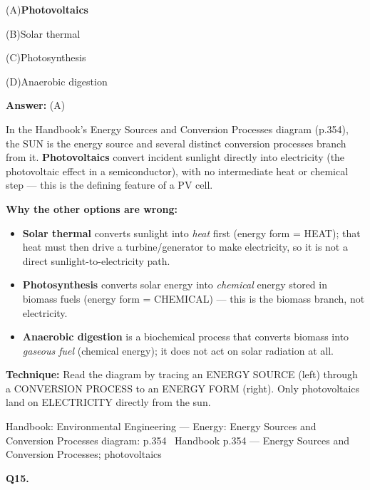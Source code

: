 \documentclass[11pt]{article}
\newcommand{\correct}[1]{\textbf{#1}\;{\color{accent}$\checkmark$}}
\newcommand{\optline}[2]{\par\noindent\hspace{1.2em}(#1)\hspace{0.6em}#2}
\begin{document}
\optline{A}{\correct{Photovoltaics}}
\optline{B}{Solar thermal}
\optline{C}{Photosynthesis}
\optline{D}{Anaerobic digestion}
\par\vspace{3pt}
\vspace{2pt}\par\noindent\colorbox{boxbg}{\parbox{\dimexpr\linewidth-2\fboxsep\relax}{%
\vspace{2pt}\textbf{Answer:} (A)\par\vspace{2pt}
{\small In the Handbook's Energy Sources and Conversion Processes diagram (p.354), the SUN is the energy source and several distinct conversion processes branch from it. \textbf{Photovoltaics} convert incident sunlight directly into electricity (the photovoltaic effect in a semiconductor), with no intermediate heat or chemical step --- this is the defining feature of a PV cell.\par
\textbf{Why the other options are wrong:}\par
\begin{itemize}\setlength{\itemsep}{0pt}\setlength{\parskip}{0pt}
\item \textbf{Solar thermal} converts sunlight into \emph{heat} first (energy form = HEAT); that heat must then drive a turbine/generator to make electricity, so it is not a direct sunlight-to-electricity path.
\item \textbf{Photosynthesis} converts solar energy into \emph{chemical} energy stored in biomass fuels (energy form = CHEMICAL) --- this is the biomass branch, not electricity.
\item \textbf{Anaerobic digestion} is a biochemical process that converts biomass into \emph{gaseous fuel} (chemical energy); it does not act on solar radiation at all.
\end{itemize}
\textbf{Technique:} Read the diagram by tracing an ENERGY SOURCE (left) through a CONVERSION PROCESS to an ENERGY FORM (right). Only photovoltaics land on ELECTRICITY directly from the sun.\par}\par\vspace{2pt}
{\footnotesize\color{soft}Handbook: Environmental Engineering --- Energy: Energy Sources and Conversion Processes diagram: p.354 \textbullet\ Handbook p.354 --- Energy Sources and Conversion Processes; photovoltaics}\vspace{2pt}
}}
\vspace{9pt}
\filbreak
\textbf{\color{accent}Q15.}\par\vspace{2pt}
\end{document}
